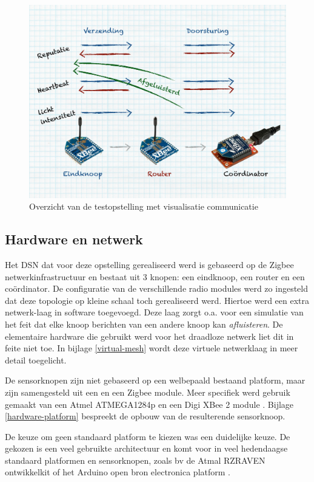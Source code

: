 \begin{figure}[ht]
  \centering
  \includegraphics[width=0.75\linewidth]{resources/setup.pdf}
  \caption{Overzicht van de testopstelling met visualisatie communicatie}
  \label{fig:setup}
\end{figure}

\vspace{-5mm}

\subsection{Hardware en netwerk}
\label{subsection:eval-hardware}

Het DSN dat voor deze opstelling gerealiseerd werd is gebaseerd op de Zigbee
netwerkinfrastructuur en bestaat uit 3 knopen: een eindknoop, een router en een
co\"ordinator. De configuratie van de verschillende radio modules werd zo
ingesteld dat deze topologie op kleine schaal toch gerealiseerd werd. Hiertoe
werd een extra netwerk-laag in software toegevoegd. Deze laag zorgt o.a. voor
een simulatie van het feit dat elke knoop berichten van een andere knoop kan
\emph{afluisteren}. De elementaire hardware die gebruikt werd voor het
draadloze netwerk liet dit in feite niet toe. In bijlage \ref{virtual-mesh}
wordt deze virtuele netwerklaag in meer detail toegelicht.

De sensorknopen zijn niet gebaseerd op een welbepaald bestaand platform, maar
zijn samengesteld uit een \mcu en een Zigbee module. Meer specifiek werd
gebruik gemaakt van een Atmel ATMEGA1284p \citep{datasheet:atmega1284p} en een
Digi XBee 2 module \citep{manual:xbee}. Bijlage \ref{hardware-platform}
bespreekt de opbouw van de resulterende sensorknoop.

De keuze om geen standaard platform te kiezen was een duidelijke keuze. De
gekozen \mcu is een veel gebruikte architectuur en komt voor in veel
hedendaagse standaard platformen en sensorknopen, zoals bv de Atmal RZRAVEN
ontwikkelkit \citep{manual:rzraven} of het Arduino open bron electronica
platform \citep{url:arduino}.

